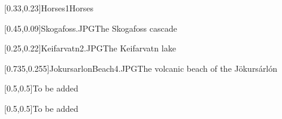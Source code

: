 



\graphicspath{{Figures/}{Figures/Iceland/}}


\subtitle{Day 3}
\date{28.10.2019}


    
    [0.33,0.23]{Horses1}{Horses}
    
    
    [0.45,0.09]{Skogafoss.JPG}{The Skogafoss cascade}
    
    [0.25,0.22]{Keifarvatn2.JPG}{The Keifarvatn lake}
    
    [0.735,0.255]{JokursarlonBeach4.JPG}{The volcanic beach of the J\"okurs\'arl\'on}
    
    [0.5,0.5]{}{To be added}
    
    [0.5,0.5]{}{To be added}
    

